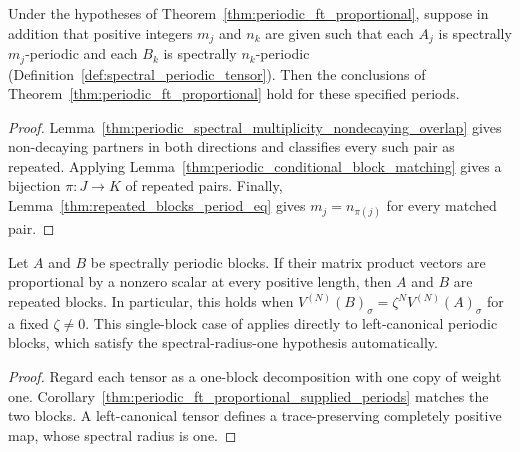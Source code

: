 \begin{corollary}%
    \label{thm:periodic_ft_proportional_supplied_periods}
    \leanok
    Under the hypotheses of Theorem~\ref{thm:periodic_ft_proportional}, suppose
    in addition that positive integers $m_j$ and $n_k$ are given such that each
    $A_j$ is spectrally $m_j$-periodic and each $B_k$ is spectrally $n_k$-periodic
    (Definition~\ref{def:spectral_periodic_tensor}). Then the conclusions of
    Theorem~\ref{thm:periodic_ft_proportional} hold for these specified periods.
\end{corollary}
\begin{proof}
    \leanok
    Lemma~\ref{thm:periodic_spectral_multiplicity_nondecaying_overlap}
    gives non-decaying partners in both directions and classifies every
    such pair as repeated. Applying
    Lemma~\ref{thm:periodic_conditional_block_matching} gives a bijection
    $\pi\colon J\to K$ of repeated pairs. Finally,
    Lemma~\ref{thm:repeated_blocks_period_eq} gives $m_j=n_{\pi(j)}$ for every
    matched pair.
\end{proof}

\begin{lemma}
    \label{thm:periodic_proportional_single_block}
    \leanok
    Let $A$ and $B$ be spectrally periodic blocks. If their matrix product
    vectors are proportional by a nonzero scalar at every positive length,
    then $A$ and $B$ are repeated blocks. In particular, this holds when
    $V^{(N)}(B)_\sigma=\zeta^N V^{(N)}(A)_\sigma$ for a fixed $\zeta\ne0$.
    This single-block case of \cite[Theorem~3.4]{DeLasCuevas2017Irreducible}
    applies directly to left-canonical periodic blocks, which satisfy the
    spectral-radius-one hypothesis automatically.
\end{lemma}

\begin{proof}
    \leanok
    Regard each tensor as a one-block decomposition with one copy of
    weight one. Corollary~\ref{thm:periodic_ft_proportional_supplied_periods}
    matches the two blocks. A left-canonical tensor defines a
    trace-preserving completely positive map, whose spectral radius is one.
\end{proof}

